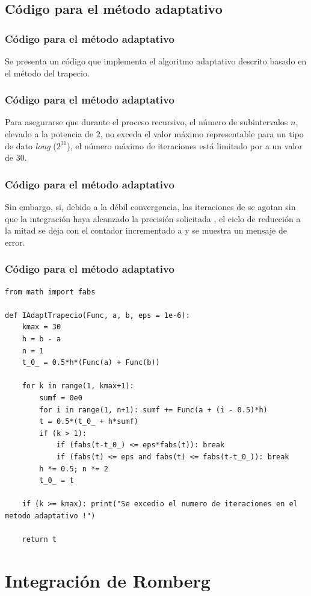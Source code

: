\subsection*{Código para el método adaptativo}
\begin{frame}
\frametitle{Código para el método adaptativo}
Se presenta un código que implementa el algoritmo adaptativo descrito basado en el método del trapecio.
\end{frame}
\begin{frame}
\frametitle{Código para el método adaptativo}
Para asegurarse que durante el proceso recursivo, el número de subintervalos $n$, elevado a la potencia de $2$, no exceda el valor máximo representable para un tipo de dato \emph{long} ($2^{31}$), el número máximo de iteraciones está limitado por  a un valor de 30.
\end{frame}
\begin{frame}
\frametitle{Código para el método adaptativo}
Sin embargo, si, debido a la débil convergencia, las iteraciones de  se agotan sin que la integración haya alcanzado la precisión solicitada , el ciclo de reducción a la mitad se deja con el contador  incrementado a  y se muestra un mensaje de error.
\end{frame}
\begin{frame}
\frametitle{Código para el método adaptativo}
\begin{lstlisting}[caption=Código para la función trapecios, style=FormattedNumber, basicstyle=\linespread{1.1}\ttfamily=\small, columns=fullflexible]
from math import fabs

def IAdaptTrapecio(Func, a, b, eps = 1e-6):
    kmax = 30
    h = b - a
    n = 1
    t_0_ = 0.5*h*(Func(a) + Func(b))

    for k in range(1, kmax+1):
        sumf = 0e0
        for i in range(1, n+1): sumf += Func(a + (i - 0.5)*h)
        t = 0.5*(t_0_ + h*sumf)
        if (k > 1):
            if (fabs(t-t_0_) <= eps*fabs(t)): break
            if (fabs(t) <= eps and fabs(t) <= fabs(t-t_0_)): break
        h *= 0.5; n *= 2
        t_0_ = t

    if (k >= kmax): print("Se excedio el numero de iteraciones en el metodo adaptativo !")

    return t
\end{lstlisting}
\end{frame}
\section{Integración de Romberg}
